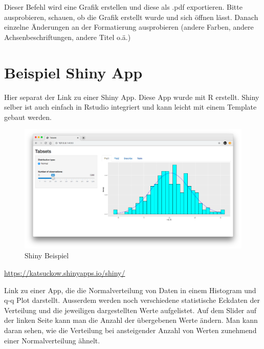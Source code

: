 \documentclass[]{book}
\begin{document}
Dieser Befehl wird eine Grafik erstellen und diese als .pdf exportieren.
Bitte ausprobieren, schauen, ob die Grafik erstellt wurde und sich
öffnen lässt. Danach einzelne Änderungen an der Formatierung
ausprobieren (andere Farben, andere Achsenbeschriftungen, andere Titel
o.ä.)

\chapter{Beispiel Shiny App}\label{beispiel-shiny-app}

Hier separat der Link zu einer Shiny App. Diese App wurde mit R
erstellt. Shiny selber ist auch einfach in Rstudio integriert und kann
leicht mit einem Template gebaut werden.

\begin{figure}
\centering
\includegraphics{./img/Shiny-Example.png}
\caption{Shiny Beispiel}
\end{figure}

\url{https://katsuckow.shinyapps.io/shiny/}

Link zu einer App, die die Normalverteilung von Daten in einem Histogram
und q-q Plot darstellt. Ausserdem werden noch verschiedene statistische
Eckdaten der Verteilung und die jeweiligen dargestellten Werte
aufgelistet. Auf dem Slider auf der linken Seite kann man die Anzahl der
übergebenen Werte ändern. Man kann daran sehen, wie die Verteilung bei
ansteigender Anzahl von Werten zunehmend einer Normalverteilung ähnelt.


\end{document}
